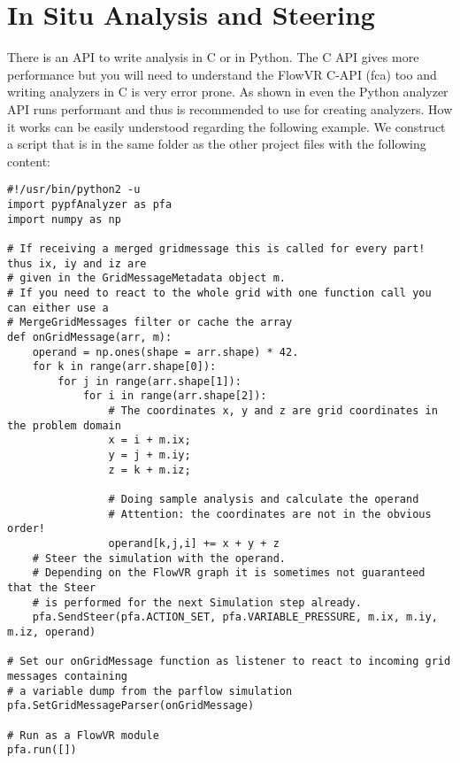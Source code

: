 \section{In Situ Analysis and Steering}
There is an API to write analysis in C or in Python. The C API gives more performance but you will
need to understand the FlowVR C-API (fca) too and writing analyzers in C is very error
prone. As shown in
\cite{thesisFriedemann2018} even the Python analyzer API runs performant and thus is recommended to
use for creating analyzers.
How it works can be easily understood regarding the following example. We construct a
 script that is in the same folder as the other project files with the
following content:
\begin{display}\begin{verbatim}
#!/usr/bin/python2 -u
import pypfAnalyzer as pfa
import numpy as np

# If receiving a merged gridmessage this is called for every part! thus ix, iy and iz are
# given in the GridMessageMetadata object m.
# If you need to react to the whole grid with one function call you can either use a
# MergeGridMessages filter or cache the array
def onGridMessage(arr, m):
    operand = np.ones(shape = arr.shape) * 42.
    for k in range(arr.shape[0]):
        for j in range(arr.shape[1]):
            for i in range(arr.shape[2]):
                # The coordinates x, y and z are grid coordinates in the problem domain
                x = i + m.ix;
                y = j + m.iy;
                z = k + m.iz;

                # Doing sample analysis and calculate the operand
                # Attention: the coordinates are not in the obvious order!
                operand[k,j,i] += x + y + z
    # Steer the simulation with the operand.
    # Depending on the FlowVR graph it is sometimes not guaranteed that the Steer
    # is performed for the next Simulation step already.
    pfa.SendSteer(pfa.ACTION_SET, pfa.VARIABLE_PRESSURE, m.ix, m.iy, m.iz, operand)

# Set our onGridMessage function as listener to react to incoming grid messages containing
# a variable dump from the parflow simulation
pfa.SetGridMessageParser(onGridMessage)

# Run as a FlowVR module
pfa.run([])
\end{verbatim}\end{display}

